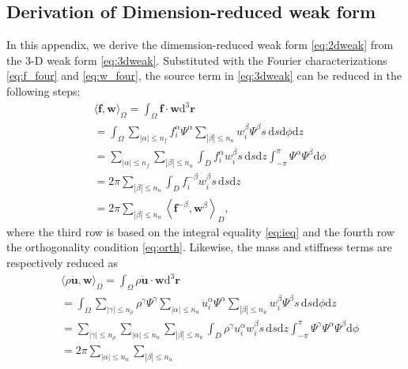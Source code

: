 \documentclass[extra,referee]{gji}
\begin{document}
\begin{appendices}
\section{Derivation of Dimension-reduced weak form}
\label{sec:dweak}
In this appendix, we derive the dimemsion-reduced weak form 
\eqref{eq:2dweak} from the 3-D weak form \eqref{eq:3dweak}.
Substituted with the Fourier characterizations \eqref{eq:f_four} and 
\eqref{eq:w_four}, the source term in \eqref{eq:3dweak} can be reduced 
in the following steps:
\begin{equation}
  \begin{alignedat}{1}
    &\langle \mathbf{f},\mathbf{w}\rangle _{\Omega} =
    \int_{\Omega}\mathbf{f}\cdot\mathbf{w}\text{d}^{3}\mathbf{r} \\&=
    \int_{\Omega} \sum_{|\alpha|\le n_f} f_i^\alpha \Psi^\alpha
    \sum_{|\beta|\le n_u}  w_i^\beta \Psi^\beta s\,\text{d}s\text{d}\phi \text{d}z \\&=
    \sum_{|\alpha|\le n_f} \sum_{|\beta|\le n_u}  
    \int_{D} f_i^\alpha w_i^\beta s\,\text{d}s\text{d}z 
    \int_{-\pi}^{\pi} \Psi^\alpha \Psi^\beta \text{d}\phi\\&=
    2\pi \sum_{|\beta|\le n_u} \int_{D} f_i^{-\beta} w_i^\beta s\,\text{d}s\text{d}z \\&=
    2\pi \sum_{|\beta|\le n_u} \left\langle \mathbf{f}^{-\beta},
    \mathbf{w}^{\beta}\right\rangle_{D},
  \end{alignedat}
  \label{eq:a1}
\end{equation}
where the third row is based on the integral equality \eqref{eq:ieq}
and the fourth row the orthogonality condition \eqref{eq:orth}.
Likewise, the mass and stiffness terms are respectively reduced as
\begin{equation}
  \begin{alignedat}{1}
    &\langle \rho \ddot{\mathbf{u}},\mathbf{w}\rangle _{\Omega} =
    \int_{\Omega} \rho \ddot{\mathbf{u}} \cdot\mathbf{w}\text{d}^{3}\mathbf{r} \\&=
    \int_{\Omega} \sum_{|\gamma|\le n_\rho} \rho^\gamma \Psi^\gamma
    \sum_{|\alpha|\le n_u} \ddot{u}_i^\alpha \Psi^\alpha
    \sum_{|\beta|\le n_u}  w_i^\beta \Psi^\beta s\,\text{d}s\text{d}\phi \text{d}z \\&=
    \sum_{|\gamma|\le n_\rho} \sum_{|\alpha|\le n_u} \sum_{|\beta|\le n_u}  
    \int_{D} \rho^\gamma u_i^\alpha w_i^\beta s\,\text{d}s\text{d}z 
    \int_{-\pi}^{\pi} \Psi^\gamma \Psi^\alpha \Psi^\beta \text{d}\phi\\&=
    2\pi \sum_{|\alpha|\le n_u} \sum_{|\beta|\le n_u} 

\end{alignedat}
\end{equation}
\end{appendices}
\end{document}
